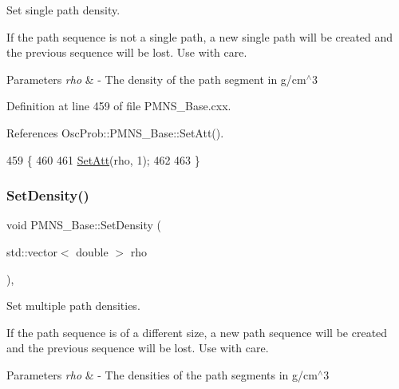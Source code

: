 Set single path density.

If the path sequence is not a single path, a new single path will be created and the previous sequence will be lost. Use with care.


\begin{DoxyParams}{Parameters}
{\em rho} & -\/ The density of the path segment in g/cm$^\wedge$3 \\
\hline
\end{DoxyParams}


Definition at line 459 of file P\+M\+N\+S\+\_\+\+Base.\+cxx.



References Osc\+Prob\+::\+P\+M\+N\+S\+\_\+\+Base\+::\+Set\+Att().


\begin{DoxyCode}
459                                     \{
460 
461   \hyperlink{classOscProb_1_1PMNS__Base_aba565962a440d14bee7a2a96d2eca2c5}{SetAtt}(rho, 1);
462 
463 \}
\end{DoxyCode}
\mbox{\label{classOscProb_1_1PMNS__Base_a858221d5510fe732dc6a101fd305cda0}} 
\subsubsection{\texorpdfstring{Set\+Density()}{SetDensity()}\hspace{0.1cm}{\footnotesize\ttfamily [2/2]}}
{\footnotesize\ttfamily void P\+M\+N\+S\+\_\+\+Base\+::\+Set\+Density (\begin{DoxyParamCaption}\item[{std\+::vector$<$ double $>$}]{rho }\end{DoxyParamCaption})\hspace{0.3cm}{\ttfamily [virtual]}, {\ttfamily [inherited]}}

Set multiple path densities.

If the path sequence is of a different size, a new path sequence will be created and the previous sequence will be lost. Use with care.


\begin{DoxyParams}{Parameters}
{\em rho} & -\/ The densities of the path segments in g/cm$^\wedge$3 \\
\hline
\end{DoxyParams}



